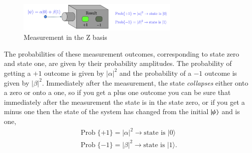 \begin{figure}[H]
    \centering
    \includegraphics[width=0.7\textwidth]{lesson2/Pauli_z_machine.pdf}
    
        \caption{Measurement in the Z basis}
    
    \label{fig:z-measure}
\end{figure}

The probabilities of these measurement outcomes, corresponding to state zero and state one, are given by their probability amplitudes. The probability of getting a $+1$ outcome is given by $|\alpha|^2$ and the probability of a $-1$ outcome is given by $|\beta|^2$. Immediately after the measurement, the state \emph{collapses} either onto a zero or onto a one, so if you get a plus one outcome you can be sure that immediately after the measurement the state is in the state zero, or if you get a minus one then the state of the system has changed from the initial $\left| \psi \right\rangle$ and is one,
\begin{align}
\operatorname{Prob}\{+1\}=|\alpha|^2 \rightarrow \textrm{state is } |0\rangle \\
\operatorname{Prob}\{-1\}=|\beta|^2 \rightarrow \textrm{state is } |1\rangle.
\end{align}

